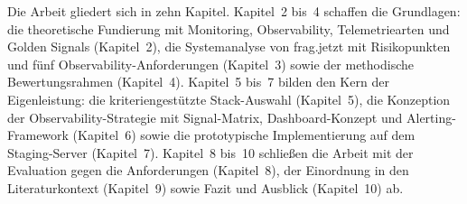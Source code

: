 Die Arbeit gliedert sich in zehn Kapitel. Kapitel~2 bis~4 schaffen die Grundlagen: die theoretische Fundierung mit Monitoring, Observability, Telemetriearten und Golden Signals (Kapitel~2), die Systemanalyse von frag.jetzt mit Risikopunkten und fünf Observability-Anforderungen (Kapitel~3) sowie der methodische Bewertungsrahmen (Kapitel~4). Kapitel~5 bis~7 bilden den Kern der Eigenleistung: die kriteriengestützte Stack-Auswahl (Kapitel~5), die Konzeption der Observability-Strategie mit Signal-Matrix, Dashboard-Konzept und Alerting-Framework (Kapitel~6) sowie die prototypische Implementierung auf dem Staging-Server (Kapitel~7). Kapitel~8 bis~10 schließen die Arbeit mit der Evaluation gegen die Anforderungen (Kapitel~8), der Einordnung in den Literaturkontext (Kapitel~9) sowie Fazit und Ausblick (Kapitel~10) ab.